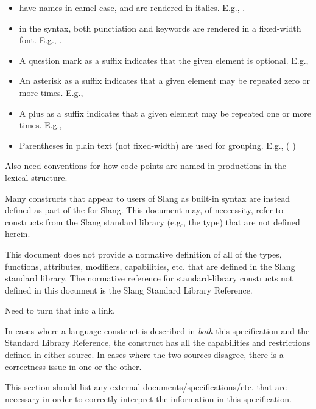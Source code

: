 \begin{itemize}
    \item{ have names in camel case, and are rendered in italics. E.g., .}
    \item{ in the syntax, both punctiation and keywords are rendered in a fixed-width font. E.g., .}
    \item{A question mark as a suffix indicates that the given element is optional. E.g., \SynOpt}
    \item{An asterisk as a suffix indicates that a given element may be repeated zero or more times. E.g., \SynStar}
    \item{A plus as a suffix indicates that a given element may be repeated one or more times. E.g., \SynPlus}
    \item{Parentheses in plain text (not fixed-width) are used for grouping. E.g.,  (\code{,} )}
\end{itemize}

\begin{Incomplete}
Also need conventions for how code points are named in productions in the lexical structure.    
\end{Incomplete}



Many constructs that appear to users of Slang as built-in syntax are instead defined as part of the  for Slang.
This document may, of neccessity, refer to constructs from the Slang standard library (e.g., the  type) that are not defined herein.

This document does not provide a normative definition of all of the types, functions, attributes, modifiers, capabilities, etc. that are defined in the Slang standard library.
The normative reference for standard-library constructs not defined in this document is the Slang Standard Library Reference.

\begin{TODO}
Need to turn that into a link.
\end{TODO}

In cases where a language construct is described in \emph{both} this specification and the Standard Library Reference, the construct has all the capabilities and restrictions defined in either source.
In cases where the two sources disagree, there is a correctness issue in one or the other.


\begin{TODO}
This section should list any external documents/specifications/etc. that are necessary in order to correctly interpret the information in this specification.
\end{TODO}